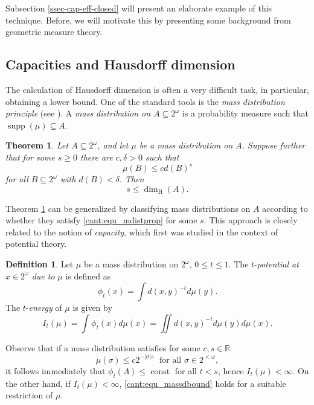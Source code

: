 \documentclass[11pt,reqno]{article}
\theoremstyle{plain}
\newtheorem{thm}{Theorem}
\theoremstyle{definition}
\newtheorem{defn}{Definition}
\theoremstyle{remark}
\numberwithin{equation}{section}
\newcommand{\Real}{\ensuremath{\mathbb{R}}}
\newcommand{\Cant}{\ensuremath{2^{\omega}}}
\newcommand{\Str}[1][<\omega]{\ensuremath{2^{#1}}}
\newcommand{\Hdim}[1][\mbox{}]{\ensuremath{\dim^{#1}_{\operatorname{H}}}}
\begin{document}
Subsection \ref{ssec-cap-eff-closed} will present an elaborate example of this technique.
Before, we will motivate this by presenting some background from geometric measure theory.




% 
% 
\subsection{Capacities and Hausdorff dimension} \label{ssec-cap-dim-class}

The calculation of Hausdorff dimension is often a very difficult task, in particular, obtaining a lower bound. One of the standard tools is the \emph{mass distribution principle} (see \citep{falconer:1990}). A \emph{mass distribution on $A \subseteq \Cant$} is a probability measure such that $\operatorname{supp}(\mu) \subseteq A$.

%
%
\begin{thm} \label{cant:thm_mdistprinc}
Let $A \subseteq \Cant$, and let $\mu$ be a mass distribution on $A$. Suppose further that for some
$s \geq 0$ there are $c, \delta > 0$ such that 
\begin{equation} \label{cant:equ_mdistprop}
        \mu(B) \leq c d(B)^s
\end{equation}
for all $B \subseteq \Cant$ with $d(B) < \delta$. Then 
\[
        s \leq \Hdim(A).
\]
\end{thm}

Theorem \ref{cant:thm_mdistprinc} can be generalized by classifying
mass distributions on $A$ according to whether they satisfy
\eqref{cant:equ_mdistprop} for some $s$. This approach is closely
related to the notion of \emph{capacity}, which first was studied in the
context of potential theory. 
 
%
%
\begin{defn} \label{cant:def_potenergy}
Let $\mu$ be a mass distribution on $\Cant$, $0 \leq t \leq 1$. The
$t$-\emph{potential at} $x \in \Cant$ \emph{due to} $\mu$ is defined
as 
\begin{equation} \label{cant:equ_poten}
        \phi_t(x) = \int d(x,y)^{-t} d\mu(y).
\end{equation}
The $t$-\emph{energy} of $\mu$ is given by
\begin{equation}\label{cant:equ_energy}
        I_t(\mu) = \int \phi_t(x) d\mu(x) = \iint
        d(x,y)^{-t} d\mu(y) d\mu(x). 
\end{equation}
\end{defn}
Observe that if a mass distribution satisfies for some $c,s \in \Real$
\begin{equation}\label{cant:equ_massdbound}
        \mu(\sigma) \leq c2^{-|\sigma|s} \; \text{ for all $\sigma \in \Str$},
\end{equation}
it follows immediately that $\phi_t(A) \leq \operatorname{const}$ for all $t < s$,
hence $I_t(\mu) < \infty$. On the other hand, if $I_t(\mu) < \infty$,
\eqref{cant:equ_massdbound} holds for a suitable restriction of
$\mu$. 
\end{document}

